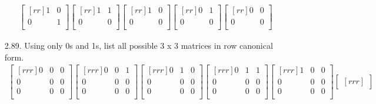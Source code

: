 \documentclass[12pt]{article}
\begin{document}
\begin{enumerate}
\begin{align*}
\begin{bmatrix}[rr]
1 & 0\\
0 & 1\\
\end{bmatrix}
\begin{bmatrix}[rr]
1 & 1\\
0 & 0\\
\end{bmatrix}
\begin{bmatrix}[rr]
1 & 0\\
0 & 0\\
\end{bmatrix}
\begin{bmatrix}[rr]
0 & 1\\
0 & 0\\
\end{bmatrix}
\begin{bmatrix}[rr]
0 & 0\\
0 & 0\\
\end{bmatrix}
\end{align*}
\item [2.89.] Using only 0s and 1s, list all possible 3 x 3 matrices in row canonical form.
\begin{align*}
\begin{bmatrix}[rrr]
0 & 0 & 0\\
0 & 0 & 0\\
0 & 0 & 0\\
\end{bmatrix}
\begin{bmatrix}[rrr]
0 & 0 & 1\\
0 & 0 & 0\\
0 & 0 & 0\\
\end{bmatrix}
\begin{bmatrix}[rrr]
0 & 1 & 0\\
0 & 0 & 0\\
0 & 0 & 0\\
\end{bmatrix}
\begin{bmatrix}[rrr]
0 & 1 & 1\\
0 & 0 & 0\\
0 & 0 & 0\\
\end{bmatrix}
\begin{bmatrix}[rrr]
1 & 0 & 0\\
0 & 0 & 0\\
0 & 0 & 0\\
\end{bmatrix}
\begin{bmatrix}[rrr]

\end{bmatrix}
\end{align*}
\end{enumerate}
\end{document}
